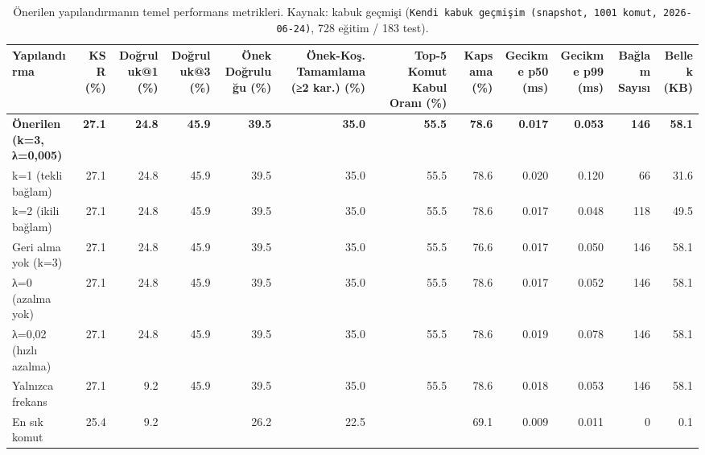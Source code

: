 \begin{table}[htbp]
  \centering
  \caption{Önerilen yapılandırmanın temel performans metrikleri. Kaynak: kabuk geçmişi (\texttt{Kendi kabuk geçmişim (snapshot, 1001 komut, 2026-06-24)}, 728 eğitim / 183 test).}
  \label{tab:metrics_summary}
  \begin{tabular}{lrrrrrrrrrrr}
    \toprule
    Yapılandırma & KSR (\%) & Doğruluk@1 (\%) & Doğruluk@3 (\%) & Önek Doğruluğu (\%) & Önek-Koş. Tamamlama (≥2 kar.) (\%) & Top-5 Komut Kabul Oranı (\%) & Kapsama (\%) & Gecikme p50 (ms) & Gecikme p99 (ms) & Bağlam Sayısı & Bellek (KB) \\
    \midrule
    \textbf{Önerilen (k=3, λ=0,005)} & \textbf{27.1} & \textbf{24.8} & \textbf{45.9} & \textbf{39.5} & \textbf{35.0} & \textbf{55.5} & \textbf{78.6} & \textbf{0.017} & \textbf{0.053} & \textbf{146} & \textbf{58.1} \\
    k=1 (tekli bağlam) & 27.1 & 24.8 & 45.9 & 39.5 & 35.0 & 55.5 & 78.6 & 0.020 & 0.120 & 66 & 31.6 \\
    k=2 (ikili bağlam) & 27.1 & 24.8 & 45.9 & 39.5 & 35.0 & 55.5 & 78.6 & 0.017 & 0.048 & 118 & 49.5 \\
    Geri alma yok (k=3) & 27.1 & 24.8 & 45.9 & 39.5 & 35.0 & 55.5 & 76.6 & 0.017 & 0.050 & 146 & 58.1 \\
    λ=0 (azalma yok) & 27.1 & 24.8 & 45.9 & 39.5 & 35.0 & 55.5 & 78.6 & 0.017 & 0.052 & 146 & 58.1 \\
    λ=0,02 (hızlı azalma) & 27.1 & 24.8 & 45.9 & 39.5 & 35.0 & 55.5 & 78.6 & 0.019 & 0.078 & 146 & 58.1 \\
    Yalnızca frekans & 27.1 & 9.2 & 45.9 & 39.5 & 35.0 & 55.5 & 78.6 & 0.018 & 0.053 & 146 & 58.1 \\
    En sık komut & 25.4 & 9.2 &  & 26.2 & 22.5 &  & 69.1 & 0.009 & 0.011 & 0 & 0.1 \\
    \bottomrule
  \end{tabular}
\end{table}
